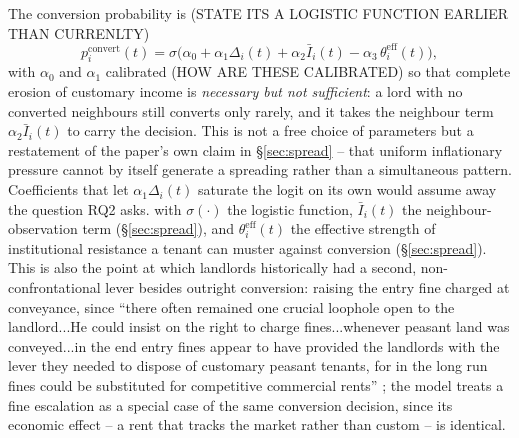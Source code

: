 \documentclass[11pt,english]{article}
\begin{document}
The conversion probability is (STATE ITS A LOGISTIC FUNCTION EARLIER THAN CURRENLTY)
\begin{equation}
p_i^{\text{convert}}(t) = \sigma\Big(\alpha_0 + \alpha_1 \Delta_i(t) + \alpha_2 \bar I_i(t) - \alpha_3\, \theta_i^{\text{eff}}(t)\Big),
\end{equation}
with $\alpha_0$ and $\alpha_1$ calibrated (HOW ARE THESE CALIBRATED) so that complete erosion of customary income is \emph{necessary but not sufficient}: a lord with no converted neighbours still converts only rarely, and it takes the neighbour term $\alpha_2\bar I_i(t)$ to carry the decision. This is not a free choice of parameters but a restatement of the paper's own claim in \S\ref{sec:spread} -- that uniform inflationary pressure cannot by itself generate a spreading rather than a simultaneous pattern. Coefficients that let $\alpha_1\Delta_i(t)$ saturate the logit on its own would assume away the question RQ2 asks.
with $\sigma(\cdot)$ the logistic function, $\bar I_i(t)$ the neighbour-observation term (\S\ref{sec:spread}), and $\theta_i^{\text{eff}}(t)$ the effective strength of institutional resistance a tenant can muster against conversion (\S\ref{sec:spread}). This is also the point at which landlords historically had a second, non-confrontational lever besides outright conversion: raising the entry fine charged at conveyance, since ``there often remained one crucial loophole open to the landlord...He could insist on the right to charge fines...whenever peasant land was conveyed...in the end entry fines appear to have provided the landlords with the lever they needed to dispose of customary peasant tenants, for in the long run fines could be substituted for competitive commercial rents'' \cite[p.62]{brenner1976agrarian}; the model treats a fine escalation as a special case of the same conversion decision, since its economic effect -- a rent that tracks the market rather than custom -- is identical. 
\end{document}
